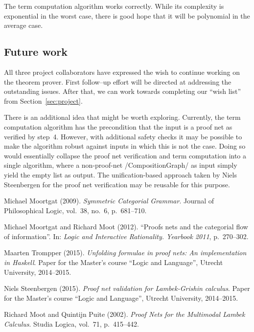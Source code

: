 \documentclass[12pt,a4paper]{article}
\begin{document}
The term computation algorithm works correctly. While its complexity is exponential in the worst case, there is good hope that it will be polynomial in the average case.


\subsection{Future work}

All three project collaborators have expressed the wish to continue working on the theorem prover. First follow--up effort will be directed at addressing the outstanding issues. After that, we can work towards completing our ``wish list'' from Section~\ref{sec:project}.

There is an additional idea that might be worth exploring. Currently, the term computation algorithm has the precondition that the input is a proof net as verified by step~4. However, with additional safety checks it may be possible to make the algorithm robust against inputs in which this is not the case. Doing so would essentially collapse the proof net verification and term computation into a single algorithm, where a non-proof-net \hs/CompositionGraph/ as input simply yield the empty list as output. The unification-based approach taken by Niels Steenbergen for the proof net verification \cite{niels} may be reusable for this purpose.


\begin{thebibliography}{9}
        Michael Moortgat (2009).
        \emph{Symmetric Categorial Grammar}.
        Journal of Philosophical Logic,
        vol.~38, no.~6, p.~681--710.
    
        Michael Moortgat and Richard Moot (2012).
        ``Proofs nets and the categorial flow of information''.
        In: \emph{Logic and Interactive Rationality. Yearbook 2011},
        p.~270--302.
    
        Maarten Trompper (2015).
        \emph{Unfolding formulae in proof nets: An implementation in Haskell}.
        Paper for the Master's course ``Logic and Language'',
        Utrecht University, 2014--2015.
    
        Niels Steenbergen (2015).
        \emph{Proof net validation for Lambek-Grishin calculus}.
        Paper for the Master's course ``Logic and Language'',
        Utrecht University, 2014--2015.
    
        Richard Moot and Quintijn Puite (2002).
        \emph{Proof Nets for the Multimodal Lambek Calculus}.
        Studia Logica, vol.~71, p.~415--442.
\end{thebibliography}
\end{document}
